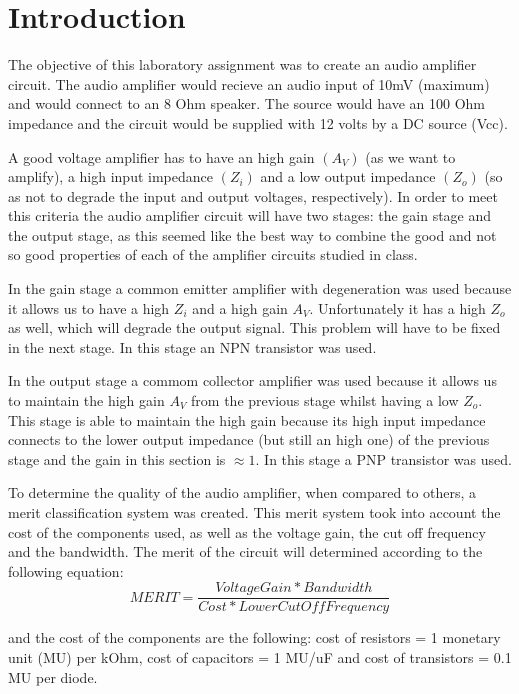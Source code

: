 \section{Introduction}
\label{sec:introduction}


\par The objective of this laboratory assignment was to create an audio amplifier circuit. The audio amplifier would recieve an audio input of 10mV (maximum) and would connect to an 8 Ohm speaker. The source would have an 100 Ohm impedance and the circuit would be supplied with 12 volts by a DC source (Vcc).
\par A good voltage amplifier has to have an high gain $(A_{V})$ (as we want to amplify), a high input impedance $(Z_{i})$ and a low output impedance $(Z_{o})$ (so as not to degrade the input and output voltages, respectively). In order to meet this criteria the audio amplifier circuit will have two stages: the gain stage and the output stage, as this seemed like the best way to combine the good and not so good properties of each of the amplifier circuits studied in class.\par
 In the gain stage a common emitter amplifier with degeneration was used because it allows us to have a high $Z_{i}$ and a high gain $A_{V}$. Unfortunately it has a high $Z_{o}$ as well, which will degrade the output signal. This problem will have to be fixed in the next stage. In this stage an NPN transistor was used.\par
 In the output stage a commom collector amplifier was used because it allows us to maintain  the high gain $A_{V}$ from the previous stage whilst having a low $Z_{o}$. This stage is able to maintain the high gain because its high input impedance connects to the lower output impedance (but still an high one) of the previous stage and the gain in this section is $\approx 1$. In this stage a PNP transistor was used.
\par   
To determine the quality of the audio amplifier, when compared to others, a merit classification system was created. This merit system took into account the cost of the components used, as well as the voltage gain, the cut off frequency and the bandwidth. The merit of the circuit will determined according to the following equation: 
\begin {equation}
	 MERIT = \frac{Voltage Gain*Bandwidth}{Cost*Lower Cut Off Frequency}   	
	\label{eq:i1}
\end{equation}

and the cost of the components are the following: cost of resistors = 1 monetary unit (MU) per kOhm, cost of capacitors = 1 MU/uF
and cost of transistors = 0.1 MU per diode. 

